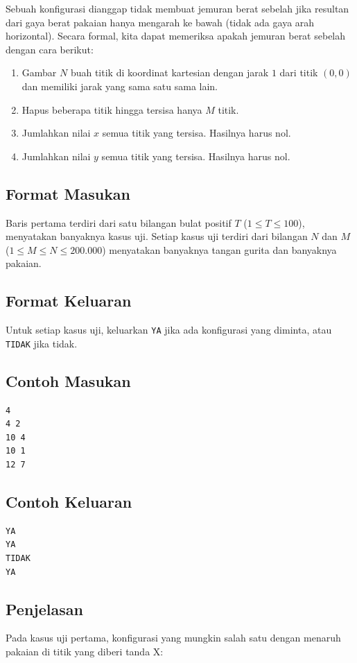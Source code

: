 \documentclass{article}
\begin{document}
Sebuah konfigurasi dianggap tidak membuat jemuran berat sebelah jika resultan dari gaya berat pakaian hanya mengarah ke bawah (tidak ada gaya arah horizontal).
Secara formal, kita dapat memeriksa apakah jemuran berat sebelah dengan cara berikut:
\begin{enumerate}
    \item Gambar $N$ buah titik di koordinat kartesian dengan jarak $1$ dari titik $(0,0)$ dan memiliki jarak yang sama satu sama lain.
    \item Hapus beberapa titik hingga tersisa hanya $M$ titik.
    \item Jumlahkan nilai $x$ semua titik yang tersisa. Hasilnya harus nol.
    \item Jumlahkan nilai $y$ semua titik yang tersisa. Hasilnya harus nol.
\end{enumerate}

\subsection*{Format Masukan}
Baris pertama terdiri dari satu bilangan bulat positif $T$ ($1 \leq T \leq 100$), menyatakan banyaknya kasus uji.
Setiap kasus uji terdiri dari bilangan $N$ dan $M$ ($1 \leq M \leq N \leq 200.000$) menyatakan banyaknya tangan gurita dan banyaknya pakaian.

\subsection*{Format Keluaran}
Untuk setiap kasus uji, keluarkan \lstinline{YA} jika ada konfigurasi yang diminta, atau \lstinline{TIDAK} jika tidak.

\begin{multicols}{2}
\subsection*{Contoh Masukan}
\begin{lstlisting}
4
4 2
10 4
10 1
12 7
\end{lstlisting}
\columnbreak
\subsection*{Contoh Keluaran}
\begin{lstlisting}
YA
YA
TIDAK
YA
\end{lstlisting}
\vfill
\null
\end{multicols}

\subsection*{Penjelasan}
Pada kasus uji pertama, konfigurasi yang mungkin salah satu dengan menaruh pakaian di titik yang diberi tanda X:
\end{document}
